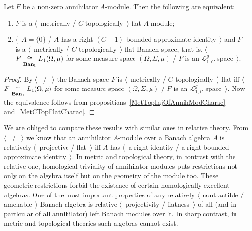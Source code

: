 \begin{proposition}\label{MetTopFlatAnnihModCharac} Let $F$ be a non-zero
annihilator $A$-module. Then the following are equivalent:

\begin{enumerate}[label = (\roman*)]
    \item $F$ is a $\langle$~metrically / $C$-topologically~$\rangle$ flat
    $A$-module;

    \item $\langle$~$A= \{0 \}$ / $A$ has a right $(C-1)$-bounded approximate
    identity~$\rangle$ and $F$ is a $\langle$~metrically /
    $C$-topologically~$\rangle$ flat Banach space, that is,
    $\langle$~$F\mathrel{\mathop{\cong}\limits_{\mathbf{Ban}_1}}L_1(\Omega,\mu)$ for some measure space
    $(\Omega, \Sigma, \mu)$ / $F$ is an $\mathscr{L}_{1,C}^g$-space~$\rangle$.
\end{enumerate}
\end{proposition}
\begin{proof} By $\langle$~\cite[theorem 1]{GrothMetrProjFlatBanSp} /
\cite[corollary 23.5(1)]{DefFloTensNorOpId}~$\rangle$ the Banach space $F$ is
$\langle$~metrically / $C$-topologically~$\rangle$ flat iff
$\langle$~$F\mathrel{\mathop{\cong}\limits_{\mathbf{Ban}_1}}L_1(\Omega,\mu)$ for some measure space
$(\Omega, \Sigma, \mu)$ / $F$ is an $\mathscr{L}_{1,C}^g$-space~$\rangle$. Now
the equivalence follows from propositions~\ref{MetTopInjOfAnnihModCharac}
and~\ref{MetCTopFlatCharac}.
\end{proof}

We are obliged to compare these results with similar ones in relative theory. From
$\langle$~\cite[proposition 2.1.7]{RamsHomPropSemgroupAlg} /
\cite[proposition 2.1.10]{RamsHomPropSemgroupAlg}~$\rangle$ we know that an
annihilator $A$-module over a Banach algebra $A$ is relatively
$\langle$~projective / flat~$\rangle$ iff $A$ has $\langle$~a right identity / a
right bounded approximate identity~$\rangle$.   
In metric and topological theory, in contrast with the relative one, homological
triviality of annihilator modules puts restrictions not only on the algebra
itself but on the geometry of the module too. These geometric restrictions
forbid the existence of certain homologically excellent algebras. One of the most
important properties of any relatively $\langle$~contractible / amenable~$\rangle$
Banach algebra is relative $\langle$~projectivity / flatness~$\rangle$ of all (and in
particular of all annihilator) left Banach modules over it. In sharp contrast,
in metric and topological theories such algebras cannot exist.

